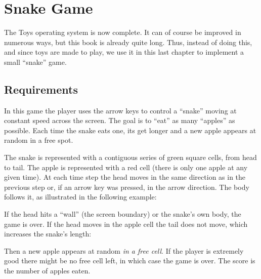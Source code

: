 
\renewcommand{\rustfile}{chapter8}
\setcounter{rustid}{0}


\chapter{Snake Game}\label{chapter:snake-game}

The Toys operating system is now complete. It can of course be improved in
numerous ways, but this book is already quite long. Thus, instead of doing
this, and since toys are made to play, we use it in this last chapter to
implement a small ``snake'' game.

\section{Requirements}

In this game the player uses the arrow keys to control a ``snake'' moving at
constant speed across the screen. The goal is to ``eat'' as many ``apples'' as
possible. Each time the snake eats one, its get longer and a new apple appears
at random in a free spot.

The snake is represented with a contiguous series of green square cells, from
head to tail. The apple is represented with a red cell (there is only one apple
at any given time). At each time step the head moves in the same direction as
in the previous step or, if an arrow key was pressed, in the arrow direction.
The body follows it, as illustrated in the following example:

\begin{center}
  
\end{center}

If the head hits a ``wall'' (the screen boundary) or the snake's own body, the
game is over. If the head moves in the apple cell the tail does not move, which
increases the snake's length:

\begin{center}
  
\end{center}

Then a new apple appears at random {\em in a free cell}. If the player is
extremely good there might be no free cell left, in which case the game is
over. The score is the number of apples eaten.

